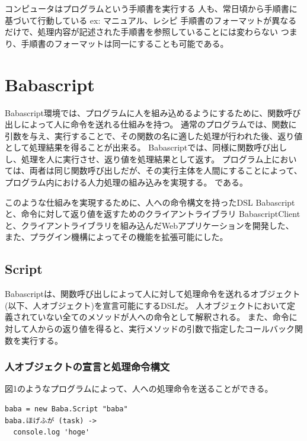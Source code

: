 コンピュータはプログラムという手順書を実行する
人も、常日頃から手順書に基づいて行動している ex: マニュアル、レシピ
手順書のフォーマットが異なるだけで、処理内容が記述された手順書を参照していることには変わらない
つまり、手順書のフォーマットは同一にすることも可能である。

\section{Babascript}\label{babascript}

Babascript環境では、プログラムに人を組み込めるようにするために、関数呼び出しによって人に命令を送れる仕組みを持つ。
通常のプログラムでは、関数に引数を与え、実行することで、その関数の名に適した処理が行われた後、返り値として処理結果を得ることが出来る。
Babascriptでは、同様に関数呼び出しし、処理を人に実行させ、返り値を処理結果として返す。
プログラム上においては、両者は同じ関数呼び出しだが、その実行主体を人間にすることによって、プログラム内における人力処理の組み込みを実現する。
である。

このような仕組みを実現するために、人への命令構文を持ったDSL Babascript
と、命令に対して返り値を返すためのクライアントライブラリ
BabascriptClientと、クライアントライブラリを組み込んだWebアプリケーションを開発した、
また、プラグイン機構によってその機能を拡張可能にした。

\subsection{Script}\label{script}

Babascriptは、関数呼び出しによって人に対して処理命令を送れるオブジェクト(以下、人オブジェクト)を宣言可能にするDSLだ。
人オブジェクトにおいて定義されていない全てのメソッドが人への命令として解釈される。
また、命令に対して人からの返り値を得ると、実行メソッドの引数で指定したコールバック関数を実行する。

\subsubsection{人オブジェクトの宣言と処理命令構文}\label{ux4ebaux30aaux30d6ux30b8ux30a7ux30afux30c8ux306eux5ba3ux8a00ux3068ux51e6ux7406ux547dux4ee4ux69cbux6587}

図1のようなプログラムによって、人への処理命令を送ることができる。

\begin{verbatim}
baba = new Baba.Script "baba"
baba.ほげふが (task) ->
  console.log 'hoge'
\end{verbatim}

